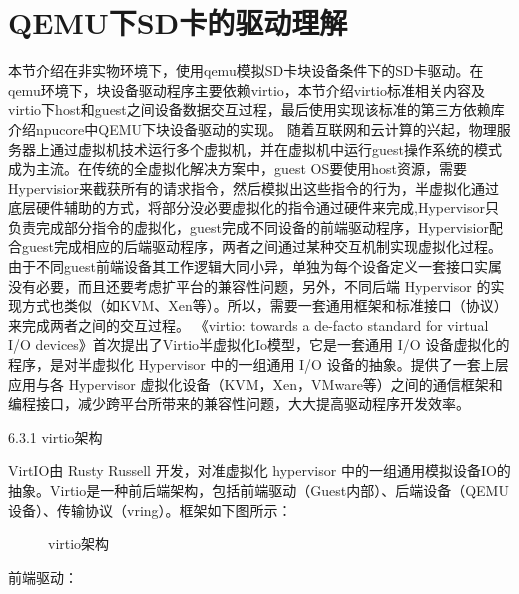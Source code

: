 \section{QEMU下SD卡的驱动理解}
本节介绍在非实物环境下，使用qemu模拟SD卡块设备条件下的SD卡驱动。在qemu环境下，块设备驱动程序主要依赖virtio，本节介绍virtio标准相关内容及virtio下host和guest之间设备数据交互过程，最后使用实现该标准的第三⽅依赖库介绍npucore中QEMU下块设备驱动的实现。
随着互联网和云计算的兴起，物理服务器上通过虚拟机技术运行多个虚拟机，并在虚拟机中运行guest操作系统的模式成为主流。在传统的全虚拟化解决方案中，guest OS要使用host资源，需要Hypervisior来截获所有的请求指令，然后模拟出这些指令的行为，半虚拟化通过底层硬件辅助的方式，将部分没必要虚拟化的指令通过硬件来完成,Hypervisor只负责完成部分指令的虚拟化，guest完成不同设备的前端驱动程序，Hypervisior配合guest完成相应的后端驱动程序，两者之间通过某种交互机制实现虚拟化过程。由于不同guest前端设备其工作逻辑大同小异，单独为每个设备定义一套接口实属没有必要，而且还要考虑扩平台的兼容性问题，另外，不同后端 Hypervisor 的实现方式也类似（如KVM、Xen等）。所以，需要⼀套通用框架和标准接口（协议）来完成两者之间的交互过程。
《virtio: towards a de-facto standard for virtual I/O devices》首次提出了Virtio半虚拟化Io模型，它是⼀套通用 I/O 设备虚拟化的程序，是对半虚拟化 Hypervisor 中的⼀组通用 I/O 设备的抽象。提供了⼀套上层应⽤与各 Hypervisor 虚拟化设备（KVM，Xen，VMware等）之间的通信框架和编程接口，减少跨平台所带来的兼容性问题，大大提高驱动程序开发效率。

6.3.1 virtio架构

VirtIO由 Rusty Russell 开发，对准虚拟化 hypervisor 中的一组通用模拟设备IO的抽象。Virtio是一种前后端架构，包括前端驱动（Guest内部）、后端设备（QEMU设备）、传输协议（vring）。框架如下图所示：

 
\begin{figure}[H]
    \centering
    \caption{virtio架构}
\end{figure}
前端驱动：

